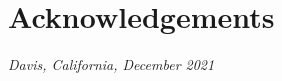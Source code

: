 {}
\section*{Acknowledgements}\label{sec:acknowledgements}
\blindtext[2]
\noindent \emph{Davis, California, December 2021}